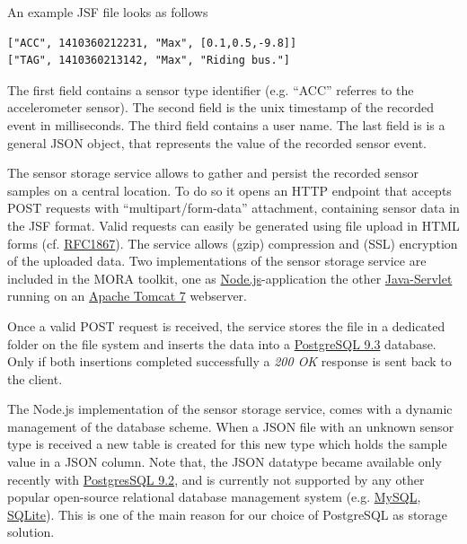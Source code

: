 \documentclass[times, 10pt,twocolumn]{article}
\begin{document}
An example JSF file looks as follows
\begingroup
\fontsize{8pt}{10pt}\selectfont
\begin{verbatim}
["ACC", 1410360212231, "Max", [0.1,0.5,-9.8]]
["TAG", 1410360213142, "Max", "Riding bus."]
\end{verbatim}
\endgroup

\noindent The first field contains a sensor type identifier (e.g. ``ACC'' referres to the accelerometer sensor). 
The second field is the unix timestamp of the recorded event in milliseconds.
The third field contains a user name.
The last field is is a general JSON object, that represents the value of the recorded sensor event.

\label{sec:storage}

The sensor storage service allows to gather and persist the recorded sensor samples on a central location.
To do so it opens an HTTP endpoint that accepts POST requests with ``multipart/form-data'' attachment, containing sensor data in the JSF format.
Valid requests can easily be generated using file upload in HTML forms (cf. \href{https://www.ietf.org/rfc/rfc1867.txt}{RFC1867}).
The service allows (gzip) compression and (SSL) encryption of the uploaded data.
Two implementations of the sensor storage service are included in the MORA toolkit, one as \href{http://nodejs.org}{Node.js}-application the other \href{https://www.jcp.org/en/jsr/detail?id=154}{Java-Servlet} running on an \href{http://tomcat.apache.org/}{Apache Tomcat 7} webserver.

Once a valid POST request is received, the service stores the file in a dedicated folder on the file system and inserts the data into a \href{http://www.postgresql.org/}{PostgreSQL 9.3} database.
Only if both insertions completed successfully a {\em 200 OK} response is sent back to the client.

The Node.js implementation of the sensor storage service, comes with a dynamic management of the database scheme.
When a JSON file with an unknown sensor type is received a new table is created for this new type which holds the sample value in a JSON column.
Note that, the JSON datatype became available only recently with \href{http://www.postgresql.org/docs/9.2/static/release-9-2.html}{PostgresSQL 9.2}, and is currently not supported by any other popular open-source relational database management system (e.g. \href{http://www.mysql.com/}{MySQL}, \href{http://www.sqlite.org/}{SQLite}).
This is one of the main reason for our choice of PostgreSQL as storage solution.
\end{document}
